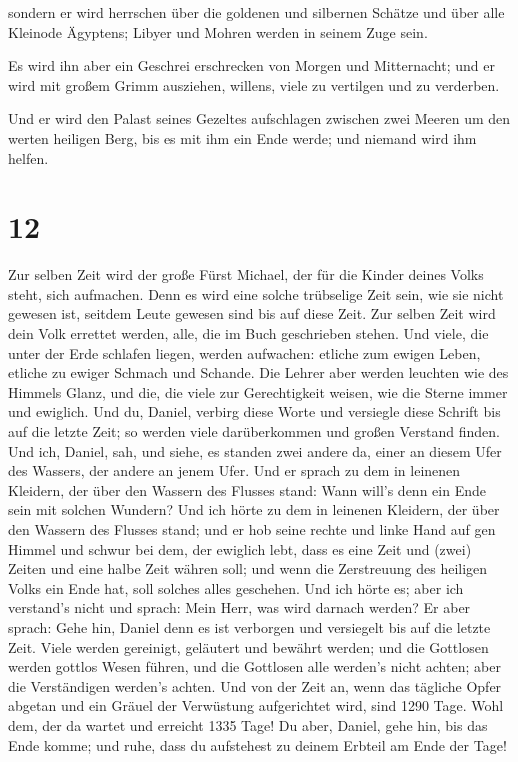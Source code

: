 sondern er wird herrschen über die goldenen und
silbernen Schätze und über alle Kleinode Ägyptens; Libyer und Mohren
werden in seinem Zuge sein.

 Es wird ihn aber ein Geschrei erschrecken von Morgen und
Mitternacht; und er wird mit großem Grimm ausziehen, willens, viele zu
vertilgen und zu verderben.

 Und er wird den Palast seines Gezeltes aufschlagen
zwischen zwei Meeren um den werten heiligen Berg, bis es mit ihm ein
Ende werde; und niemand wird ihm helfen.

\hypertarget{section-11}{%
\section{12}\label{section-11}}

 Zur selben Zeit wird der große Fürst Michael, der für die
Kinder deines Volks steht, sich aufmachen. Denn es wird eine solche
trübselige Zeit sein, wie sie nicht gewesen ist, seitdem Leute gewesen
sind bis auf diese Zeit. Zur selben Zeit wird dein Volk errettet werden,
alle, die im Buch geschrieben stehen.  Und viele, die
unter der Erde schlafen liegen, werden aufwachen: etliche zum ewigen
Leben, etliche zu ewiger Schmach und Schande.  Die Lehrer
aber werden leuchten wie des Himmels Glanz, und die, die viele zur
Gerechtigkeit weisen, wie die Sterne immer und ewiglich. 
Und du, Daniel, verbirg diese Worte und versiegle diese Schrift bis auf
die letzte Zeit; so werden viele darüberkommen und großen Verstand
finden.  Und ich, Daniel, sah, und siehe, es standen zwei
andere da, einer an diesem Ufer des Wassers, der andere an jenem Ufer.
 Und er sprach zu dem in leinenen Kleidern, der über den
Wassern des Flusses stand: Wann will's denn ein Ende sein mit solchen
Wundern?  Und ich hörte zu dem in leinenen Kleidern, der
über den Wassern des Flusses stand; und er hob seine rechte und linke
Hand auf gen Himmel und schwur bei dem, der ewiglich lebt, dass es eine
Zeit und (zwei) Zeiten und eine halbe Zeit währen soll; und wenn die
Zerstreuung des heiligen Volks ein Ende hat, soll solches alles
geschehen.  Und ich hörte es; aber ich verstand's nicht
und sprach: Mein Herr, was wird darnach werden?  Er aber
sprach: Gehe hin, Daniel denn es ist verborgen und versiegelt bis auf
die letzte Zeit.  Viele werden gereinigt, geläutert und
bewährt werden; und die Gottlosen werden gottlos Wesen führen, und die
Gottlosen alle werden's nicht achten; aber die Verständigen werden's
achten.  Und von der Zeit an, wenn das tägliche Opfer
abgetan und ein Gräuel der Verwüstung aufgerichtet wird, sind 1290 Tage.
 Wohl dem, der da wartet und erreicht 1335 Tage!
 Du aber, Daniel, gehe hin, bis das Ende komme; und ruhe,
dass du aufstehest zu deinem Erbteil am Ende der Tage!
